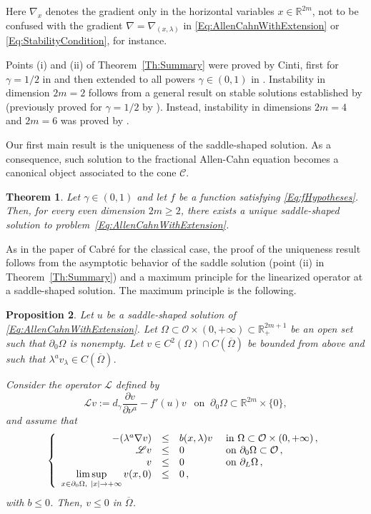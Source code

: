 \documentclass[12pt,reqno]{amsart}
\newtheorem{theorem}{Theorem}[section]
\newtheorem{proposition}[theorem]{Proposition}
\theoremstyle{definition}
\theoremstyle{remark}
\newcommand{\con}[1]{\mathbb{#1}}
\newcommand{\R}{\con{R}} %
\newcommand{\ccal}{\mathscr{C}}
\newcommand{\ocal}{\mathcal{O}}
\newcommand{\s}{\gamma}
\newcommand\beqc[1]{\left\{\begin{array}{#1}}
\newcommand\eeqc{\end{array} \right.}
\def\PDEsystem{rcll}
\let\div\relax
\DeclareMathOperator{\div}{div}
\def\ds{\displaystyle}
\numberwithin{equation}{section}
\begin{document}
Here $\nabla_x$ denotes the gradient only in the horizontal variables $x\in \R^{2m}$, not to be confused with the gradient $\nabla = \nabla_{(x,\lambda)}$ in \eqref{Eq:AllenCahnWithExtension} or \eqref{Eq:StabilityCondition}, for instance.

Points (i) and (ii) of Theorem~\ref{Th:Summary} were proved by Cinti, first for $\s = 1/2$  in \cite{Cinti-Saddle} and then extended to all powers $\s \in (0,1)$ in \cite{Cinti-Saddle2}. Instability in dimension $2m = 2$ follows from a general result on stable solutions established by \cite{CabreSireII} (previously proved for $\s = 1/2$ by \cite{CabreSolaMorales}). Instead, instability in dimensions $2m=4$ and $2m=6$ was proved by \cite{Cinti-Saddle,Cinti-Saddle2}.


Our first main result is the uniqueness of the saddle-shaped solution. As a consequence, such solution to the fractional Allen-Cahn equation becomes a canonical object associated to the cone $\ccal$.

\begin{theorem}
\label{Thm:Uniqueness}
Let $\s \in (0,1)$  and let $f$ be a function satisfying \eqref{Eq:fHypotheses}. Then, for every even dimension $2m\geq 2$, there exists a unique saddle-shaped solution to problem~\eqref{Eq:AllenCahnWithExtension}.
\end{theorem}

As in the paper of Cabré \cite{Cabre-Saddle} for the classical case, the proof of the uniqueness result follows from the asymptotic behavior of the saddle solution (point (ii) in Theorem~\ref{Th:Summary}) and a maximum principle for the linearized operator at a saddle-shaped solution. The maximum principle is the following.

\begin{proposition}
\label{Prop:MaxPrincipleLinearizedOperator}
Let $u$ be a saddle-shaped solution of \eqref{Eq:AllenCahnWithExtension}. 
Let $\Omega \subset \ocal \times (0,+\infty) \subset \R^{2m+1}_+$ be an open set such that $\partial_0 \Omega$ is nonempty. Let $v \in C^2 (\Omega)\cap C(\overline{\Omega})$ be bounded from above and such that $\lambda^a v_\lambda \in C(\overline{\Omega})$. 

Consider the operator $\mathscr{L}$ defined by 
\begin{equation}
\label{Eq:LinearizedOperator}
\mathscr{L}v := d_\s \dfrac{\partial v}{\partial \nu^a}  -f'(u) v \ \ \text{ on } \ \partial_0 \Omega \subset \R^{2m}\times\{0\},
\end{equation}
and assume that
$$
\beqc{\PDEsystem}
-\div(\lambda^a \nabla v) &\leq& b(x,\lambda) v & \text{ in } \Omega \subset \ocal \times (0,+\infty)\,, \\
\mathscr{L}v &\leq & 0 & \text{ on } \partial_0 \Omega \subset \ocal \,, \\
v & \leq & 0 & \text{ on } \partial_L \Omega \,,\\
\ds \limsup_{x\in \partial_0 \Omega, \  |x|\to +\infty} v(x,0) & \leq & 0\,,
\eeqc
$$
with $b \leq 0$. Then, $v\leq 0$ in $\overline{\Omega}$.
\end{proposition}
\end{document}
